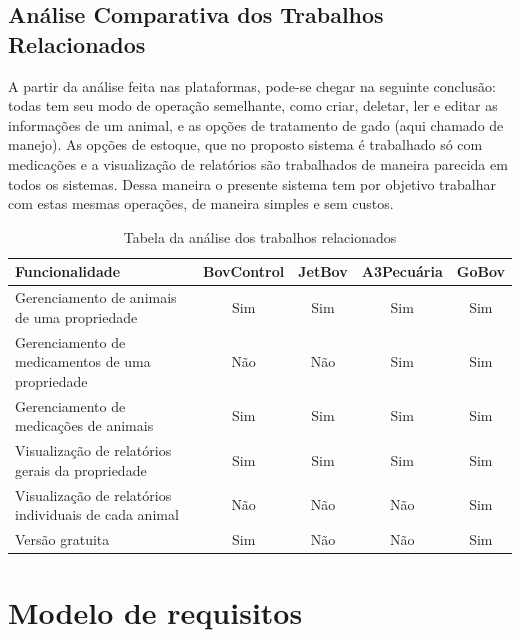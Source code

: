 \documentclass[12pt]{article}
\begin{document}
\begin{titlepage}
\begin{center}

\subsection{Análise Comparativa dos Trabalhos Relacionados}

A partir da análise feita nas plataformas, pode-se chegar na seguinte conclusão: todas tem seu modo de operação semelhante, como criar, deletar, ler e editar as informações de um animal, e as opções de tratamento de gado (aqui chamado de manejo). As opções de estoque, que no proposto sistema é trabalhado só com medicações e a visualização de relatórios são trabalhados de maneira parecida em todos os sistemas. Dessa maneira o presente sistema tem por objetivo trabalhar com estas mesmas operações, de maneira simples e sem custos.
\begin{table}[th]
	\begin{center}
		\caption{Tabela da análise dos trabalhos relacionados}
		\begin{tabular}{ | p{8cm} |  c | c | c | c |}
			\hline
			Funcionalidade & BovControl & JetBov & A3Pecuária & GoBov \\ \hline
			Gerenciamento de animais de uma propriedade & Sim & Sim & Sim & Sim \\  \hline
			Gerenciamento de medicamentos de uma propriedade & Não & Não & Sim & Sim  \\ \hline
			Gerenciamento de medicações de animais & Sim & Sim & Sim & Sim  \\ \hline
			Visualização de relatórios gerais da propriedade & Sim & Sim & Sim & Sim  \\ \hline
			Visualização de relatórios individuais de cada animal & Não & Não & Não & Sim  \\ \hline
			Versão gratuita & Sim & Não & Não & Sim  \\
			\hline
		\end{tabular}
	\end{center}
\end{table}

\newpage

\section{Modelo de requisitos}


\end{center}
\end{titlepage}
\end{document}

